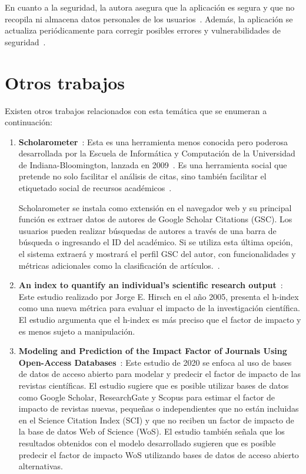 En cuanto a la seguridad, la autora asegura que la aplicación es segura y que no recopila ni almacena datos personales de los usuarios~\cite{harzing2010}. Además, la aplicación se actualiza periódicamente para corregir posibles errores y vulnerabilidades de seguridad~\cite{pop2007}.





\section{Otros trabajos}

Existen otros trabajos relacionados con esta temática que se enumeran a continuación:

\begin{enumerate} 

  \item \textbf{Scholarometer}~\cite{scholarometer2018}:  Esta es una herramienta menos conocida pero poderosa desarrollada por la Escuela de Informática y Computación de la Universidad de Indiana-Bloomington, lanzada en 2009~\cite{kaur2012}. Es una herramienta social que pretende no solo facilitar el análisis de citas, sino también facilitar el etiquetado social de recursos académicos~\cite{lopez2017}.
  
  Scholarometer se instala como extensión en el navegador web y su principal función es extraer datos de autores de Google Scholar Citations (GSC). Los usuarios pueden realizar búsquedas de autores a través de una barra de búsqueda o ingresando el ID del académico. Si se utiliza esta última opción, el sistema extraerá y mostrará el perfil GSC del autor, con funcionalidades y métricas adicionales como la clasificación de artículos.~\cite{lopez2017}.
  

  \item \textbf{An index to quantify an individual's scientific research output}~\cite{hirsch2005}:  Este estudio realizado por Jorge E. Hirsch en el año 2005, presenta el h-index como una nueva métrica para evaluar el impacto de la investigación científica. El estudio argumenta que el h-index es más preciso que el factor de impacto y es menos sujeto a manipulación.


  \item \textbf{Modeling and Prediction of the Impact Factor of Journals Using Open-Access Databases}~\cite{templ2020}: Este estudio de 2020 se enfoca al uso de bases de datos de acceso abierto para modelar y predecir el factor de impacto de las revistas científicas. El estudio sugiere que es posible utilizar bases de datos como Google Scholar, ResearchGate y Scopus para estimar el factor de impacto de revistas nuevas, pequeñas o independientes que no están incluidas en el Science Citation Index (SCI) y que no reciben un factor de impacto de la base de datos Web of Science (WoS). El estudio también señala que los resultados obtenidos con el modelo desarrollado sugieren que es posible predecir el factor de impacto WoS utilizando bases de datos de acceso abierto alternativas.
  
\end{enumerate}

